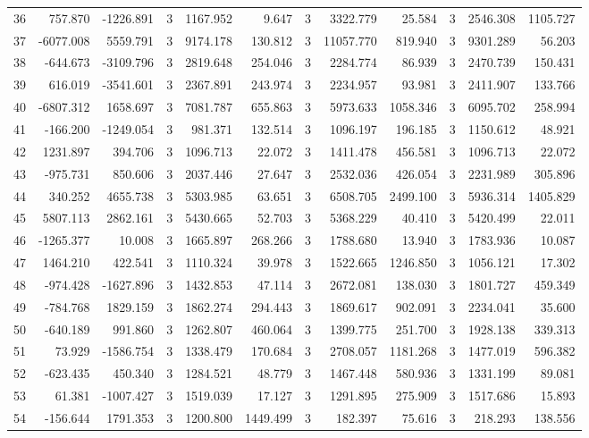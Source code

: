 \begin{table}[ht]
\begin{tabular}{lrrrrrrrrrrr}
36 & 757.870 & -1226.891 & 3 & 1167.952 & 9.647 & 3 & 3322.779 & 25.584 & 3 & 2546.308 & 1105.727 \\
37 & -6077.008 & 5559.791 & 3 & 9174.178 & 130.812 & 3 & 11057.770 & 819.940 & 3 & 9301.289 & 56.203 \\
38 & -644.673 & -3109.796 & 3 & 2819.648 & 254.046 & 3 & 2284.774 & 86.939 & 3 & 2470.739 & 150.431 \\
39 & 616.019 & -3541.601 & 3 & 2367.891 & 243.974 & 3 & 2234.957 & 93.981 & 3 & 2411.907 & 133.766 \\
40 & -6807.312 & 1658.697 & 3 & 7081.787 & 655.863 & 3 & 5973.633 & 1058.346 & 3 & 6095.702 & 258.994 \\
41 & -166.200 & -1249.054 & 3 & 981.371 & 132.514 & 3 & 1096.197 & 196.185 & 3 & 1150.612 & 48.921 \\
42 & 1231.897 & 394.706 & 3 & 1096.713 & 22.072 & 3 & 1411.478 & 456.581 & 3 & 1096.713 & 22.072 \\
43 & -975.731 & 850.606 & 3 & 2037.446 & 27.647 & 3 & 2532.036 & 426.054 & 3 & 2231.989 & 305.896 \\
44 & 340.252 & 4655.738 & 3 & 5303.985 & 63.651 & 3 & 6508.705 & 2499.100 & 3 & 5936.314 & 1405.829 \\
45 & 5807.113 & 2862.161 & 3 & 5430.665 & 52.703 & 3 & 5368.229 & 40.410 & 3 & 5420.499 & 22.011 \\
46 & -1265.377 & 10.008 & 3 & 1665.897 & 268.266 & 3 & 1788.680 & 13.940 & 3 & 1783.936 & 10.087 \\
47 & 1464.210 & 422.541 & 3 & 1110.324 & 39.978 & 3 & 1522.665 & 1246.850 & 3 & 1056.121 & 17.302 \\
48 & -974.428 & -1627.896 & 3 & 1432.853 & 47.114 & 3 & 2672.081 & 138.030 & 3 & 1801.727 & 459.349 \\
49 & -784.768 & 1829.159 & 3 & 1862.274 & 294.443 & 3 & 1869.617 & 902.091 & 3 & 2234.041 & 35.600 \\
50 & -640.189 & 991.860 & 3 & 1262.807 & 460.064 & 3 & 1399.775 & 251.700 & 3 & 1928.138 & 339.313 \\
51 & 73.929 & -1586.754 & 3 & 1338.479 & 170.684 & 3 & 2708.057 & 1181.268 & 3 & 1477.019 & 596.382 \\
52 & -623.435 & 450.340 & 3 & 1284.521 & 48.779 & 3 & 1467.448 & 580.936 & 3 & 1331.199 & 89.081 \\
53 & 61.381 & -1007.427 & 3 & 1519.039 & 17.127 & 3 & 1291.895 & 275.909 & 3 & 1517.686 & 15.893 \\
54 & -156.644 & 1791.353 & 3 & 1200.800 & 1449.499 & 3 & 182.397 & 75.616 & 3 & 218.293 & 138.556 \\

\end{tabular}
\end{table}
